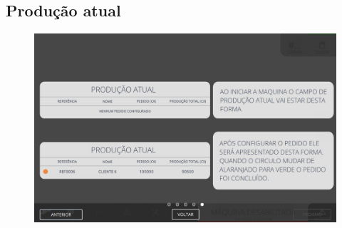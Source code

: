 \newpage
\thispagestyle{fancy}
\vspace*{40 pt}
\subsection{\small{Produção atual}}
\vspace*{\fill}
\begin{figure}[h]
    \centering
    \includegraphics[width=576 px,height=360 px]{src/imagesICV/01-main/6.png}
\end{figure}
\vspace*{\fill}
